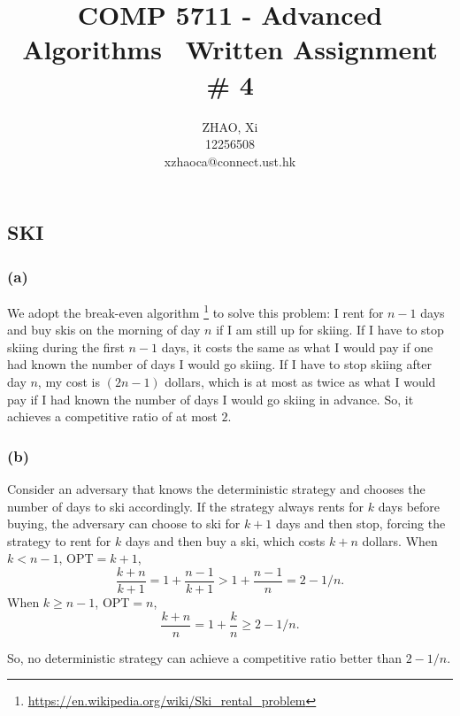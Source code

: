 \documentclass[12pt,onecolumn,a4paper]{article}
\title{\textbf{COMP 5711 - Advanced Algorithms} \ \textbf{Written Assignment \# 4}}
\author{ZHAO, Xi \\12256508 \\xzhaoca@connect.ust.hk}
\begin{document}
\maketitle

\subsection*{SKI}
\subsubsection*{(a)}
We adopt the break-even algorithm \footnote{\url{https://en.wikipedia.org/wiki/Ski_rental_problem}} to solve this problem: 
I rent for $n-1$ days and buy skis on the morning of day $n$ if I am still up for skiing. If I have to stop skiing during the first $n-1$ days, it costs the same as what I would pay if one had known the number of days I would go skiing. If I have to stop skiing after day $n$, my cost is $(2n-1)$ dollars, which is at most as twice as what I would pay if I had known the number of days I would go skiing in advance. So, it achieves a competitive ratio of at most $2$.

\subsubsection*{(b)}
Consider an adversary that knows the deterministic strategy and chooses the number of days to ski accordingly. If the strategy always rents for $k$ days before buying, the adversary can choose to ski for $k+1$ days and then stop, forcing the strategy to rent for $k$ days and then buy a ski, which costs $k+n$ dollars. When $k<n-1$, \textsf{OPT}$=k+1$, 
$$\frac{k+n}{k+1}=1+\frac{n-1}{k+1}>1+\frac{n-1}{n}=2-1/n.$$
When $k\ge n-1$, \textsf{OPT}$=n$, 
$$\frac{k+n}{n}=1+\frac{k}{n}\ge 2-1/n.$$

So, no deterministic strategy can achieve a competitive ratio better than $2-1/n$.
\end{document}
